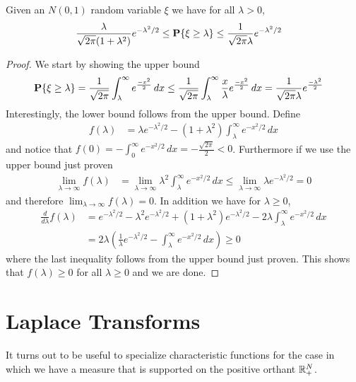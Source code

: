 \begin{lem}\label{GaussianTailsElementary}Given an $N(0,1)$ random
  variable $\xi$ we have for all $\lambda > 0$, 
\begin{align*}
\frac{\lambda}{\sqrt{2\pi}(1+\lambda^2)} e^{-\lambda^2/2}&\leq \textbf{P}\{\xi \geq
    \lambda\} \leq \frac{1}{\sqrt{2\pi} \lambda} e^{-\lambda^2/2}
\end{align*}
\end{lem}
\begin{proof}
We start by showing the upper bound 
\begin{align*}
\textbf{P}\{\xi \geq \lambda\} &= \frac{1}{\sqrt{2\pi}} \int_\lambda^\infty
e^{\frac{-x^2}{2}} \, dx 
\leq  \frac{1}{\sqrt{2\pi}} \int_\lambda^\infty
\frac{x}{\lambda} e^{\frac{-x^2}{2}} \, dx 
= \frac{1}{\sqrt{2\pi}\lambda} e^{\frac{-\lambda^2}{2}}
\end{align*}
Interestingly, the lower bound follows from the upper bound.  Define 
\begin{align*}
f(\lambda) &= \lambda e^{-\lambda^2/2} - (1 + \lambda^2)
\int_\lambda^\infty e^{-x^2/2} \, dx
\end{align*}
and notice that $f(0) = -\int_0^\infty e^{-x^2/2} \, dx =
-\frac{\sqrt{2\pi}}{2} < 0$.  Furthermore if we use the upper bound
just proven
\begin{align*}
\lim_{\lambda \to \infty} f(\lambda)
&= \lim_{\lambda \to \infty} \lambda^2 \int_\lambda^\infty e^{-x^2/2}
\, dx \leq \lim_{\lambda \to \infty} \lambda e^{-\lambda^2/2} = 0
\end{align*}
and therefore $\lim_{\lambda \to \infty} f(\lambda) = 0$.  In addition
we have for $\lambda \geq 0$,
\begin{align*}
\frac{d}{d\lambda} f(\lambda) &= e^{-\lambda^2/2} - \lambda^2
e^{-\lambda^2/2} + (1+\lambda^2) e^{-\lambda^2/2} -2\lambda
\int_\lambda^\infty e^{-x^2/2} \, dx \\
&=2\lambda \left(\frac{1}{\lambda}e^{-\lambda^2/2} -
  \int_\lambda^\infty e^{-x^2/2} \, dx \right ) \geq 0
\end{align*}
where the last inequality follows from the upper bound just proven.
This shows that $f(\lambda) \geq 0$ for all $\lambda \geq 0$ and we
are done.
\end{proof}

\section{Laplace Transforms}
It turns out to be useful to specialize characteristic functions for
the case in which we have a measure that is supported on the positive
orthant $\mathbb{R}^N_+$.  

